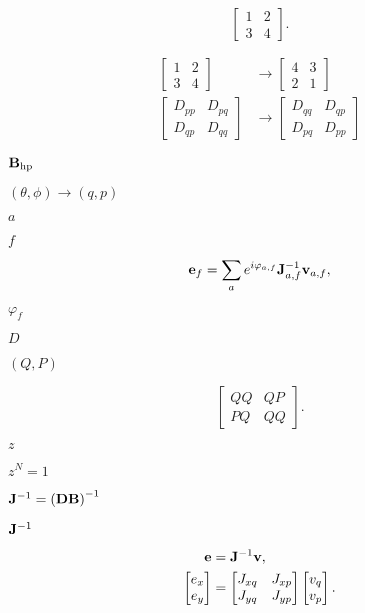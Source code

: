 \documentclass{article}
\begin{document}
\[ \begin{bmatrix} 1 & 2 \\ 3 & 4 \end{bmatrix}. \]
\pagebreak

\[ \begin{aligned} \begin{bmatrix} 1 & 2 \\ 3 & 4 \end{bmatrix} &\rightarrow \begin{bmatrix} 4 & 3 \\ 2 & 1 \end{bmatrix} \\ \begin{bmatrix} D_{pp} & D_{pq} \\ D_{qp} & D_{qq} \end{bmatrix} &\rightarrow \begin{bmatrix} D_{qq} & D_{qp} \\ D_{pq} & D_{pp} \end{bmatrix} \end{aligned} \]
\pagebreak

${\bf B}_\text{hp}$
\pagebreak

$(\theta,\phi)\rightarrow(q,p)$
\pagebreak

$a$
\pagebreak

$f$
\pagebreak

\[ {\bf e}_f = \sum_a e^{i\varphi_{a,f}} {\bf J}_{a,f}^{-1} {\bf v}_{a,f}, \]
\pagebreak

$\varphi_f$
\pagebreak

$D$
\pagebreak

$(Q,P)$
\pagebreak

\[\begin{bmatrix} QQ & QP \\ PQ & QQ \end{bmatrix}.\]
\pagebreak

$z$
\pagebreak

$z^N = 1$
\pagebreak

${\bf J}^{-1} = \left({\bf D}{\bf B}\right)^{-1}$
\pagebreak

${\bf J}^{-1}$
\pagebreak

\[ \begin{aligned} {\bf e} &= {\bf J}^{-1} {\bf v}, \\ \begin{bmatrix} e_x \\ e_y \end{bmatrix} &= \begin{bmatrix} J_{xq} & J_{xp} \\ J_{yq} & J_{yp} \end{bmatrix} \begin{bmatrix} v_q \\ v_p \end{bmatrix}. \end{aligned} \]
\pagebreak
\end{document}
